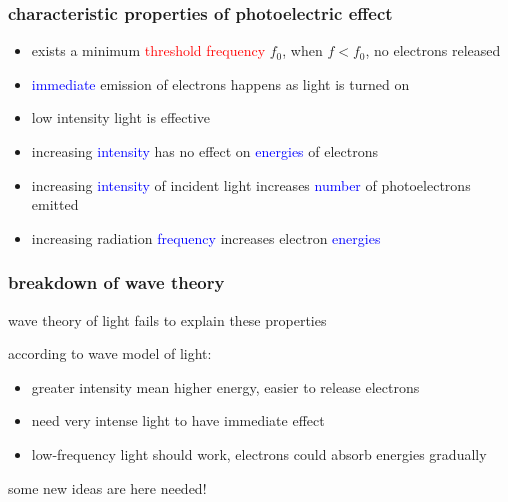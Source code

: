 \documentclass[12pt,xcolor=svgnames,handout]{beamer}
\newcommand{\keypoint}[1]{%
   \textcolor{red}{#1}%
}
\newcommand{\tightframetitle}[1]{ %
\frametitle{#1}\vspace{-.6\baselineskip}}
\begin{document}
\begin{frame}
\tightframetitle{characteristic properties of photoelectric effect}

\begin{block}{}
\begin{itemize}
\item exists a minimum \keypoint{threshold frequency} $f_0$, when $f<f_0$, no electrons released

\item \textcolor{blue}{immediate} emission of electrons happens as light is turned on

\item low intensity light is effective

\item increasing \textcolor{blue}{intensity} has no effect on \textcolor{blue}{energies} of electrons

\item increasing \textcolor{blue}{intensity} of incident light increases \textcolor{blue}{number} of photoelectrons emitted

\item increasing radiation \textcolor{blue}{frequency} increases electron \textcolor{blue}{energies}
\end{itemize}
\end{block}

\end{frame}

\begin{frame}
\tightframetitle{breakdown of wave theory}

\begin{block}{}
wave theory of light fails to explain these properties
\end{block}

\begin{block}{}
according to wave model of light:
\begin{itemize}
\item greater intensity mean higher energy, easier to release electrons

\item need very intense light to have immediate effect

\item low-frequency light should work, electrons could absorb energies gradually
\end{itemize}
\end{block}

\pause

\begin{block}{}
some new ideas are here needed!
\end{block}

\end{frame}
\end{document}

